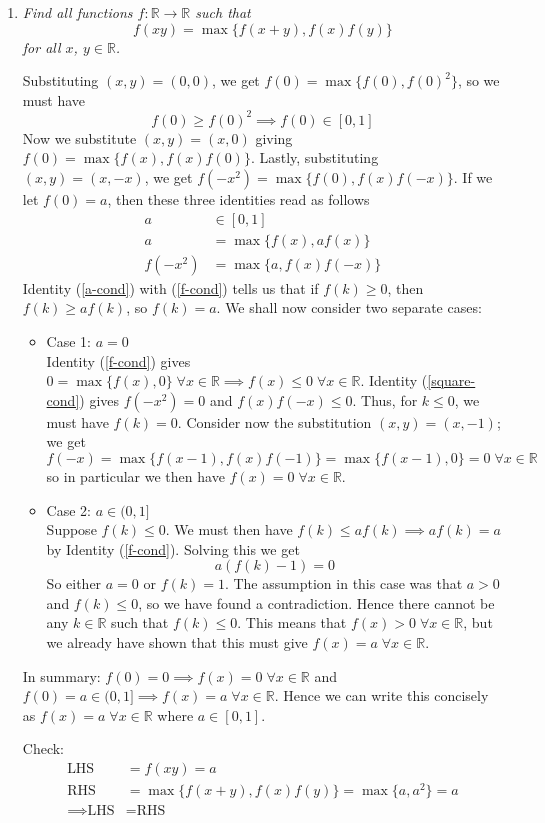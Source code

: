 \documentclass{article}
\begin{document}
\begin{enumerate}[1.]
\item %
{\itshape Find all functions $f: \mathbb{R} \rightarrow \mathbb{R}$ such that 
$$f(xy) = \max\{f(x + y), f(x)f(y)\} $$
for all $x$, $y \in \mathbb{R}$.}

Substituting $(x, y) = (0, 0)$, we get $f(0) = \max\{f(0), f(0)^2\}$, so we must have 
$$f(0) \ge f(0)^2 \implies f(0) \in [0, 1]$$ 
Now we substitute $(x, y) = (x, 0)$ giving $f(0) = \max\{f(x), f(x)f(0)\}$. Lastly, substituting $(x, y) = (x, -x)$, we get $f(-x^2) = \max\{f(0), f(x)f(-x)\}$. If we let $f(0) = a$, then these three identities read as follows
\begin{align}
a &\in [0, 1] \label{a-cond}\\
a &= \max\{f(x), af(x)\} \label{f-cond}\\
f(-x^2) &= \max\{a, f(x)f(-x)\} \label{square-cond}
\end{align}
Identity (\ref{a-cond}) with (\ref{f-cond}) tells us that if $f(k) \ge 0$, then $f(k) \ge af(k)$, so $f(k) = a$. We shall now consider two separate cases:
\begin{itemize}
  \item Case 1: $a = 0$ \\
  Identity (\ref{f-cond}) gives $0 = \max\{f(x), 0\} \; \forall x \in \mathbb{R} \implies f(x) \le 0 \; \forall x \in \mathbb{R}$. Identity (\ref{square-cond}) gives $f(-x^2) = 0$ and $f(x)f(-x) \le 0$. Thus, for $k \le 0$, we must have $f(k) = 0$. Consider now the substitution $(x,y) = (x, -1)$; we get 
  $$f(-x) = \max\{f(x - 1), f(x)f(-1)\} = \max\{f(x - 1), 0\} = 0 \; \forall x \in \mathbb{R}$$ 
  so in particular we then have $f(x) = 0 \; \forall x \in \mathbb{R}$.
  \item Case 2: $a \in (0, 1]$ \\
  Suppose $f(k) \le 0$. We must then have $f(k) \le af(k) \implies af(k) = a$ by Identity (\ref{f-cond}). Solving this we get 
  $$a(f(k) - 1) = 0 $$
  So either $a = 0$ or $f(k) = 1$. The assumption in this case was that $a > 0$ and $f(k) \le 0$, so we have found a contradiction. Hence there cannot be any $k \in \mathbb{R}$ such that $f(k) \le 0$. This means that $f(x) > 0 \; \forall x \in \mathbb{R}$, but we already have shown that this must give $f(x) = a \; \forall x \in \mathbb{R}$.
\end{itemize}
In summary: $f(0) = 0 \implies f(x) = 0 \; \forall x \in \mathbb{R}$ and $f(0) = a \in (0, 1] \implies f(x) = a \; \forall x \in \mathbb{R}$. Hence we can write this concisely as $f(x) = a \; \forall x \in \mathbb{R}$ where $a \in [0, 1]$.

Check:
\begin{align*}
  \text{LHS} &= f(xy) = a \\
  \text{RHS} &= \max\{f(x + y), f(x)f(y) \} = \max\{a, a^2\} = a \\
  \implies \text{LHS} &= \text{RHS}
\end{align*}

\end{enumerate}
\end{document}
